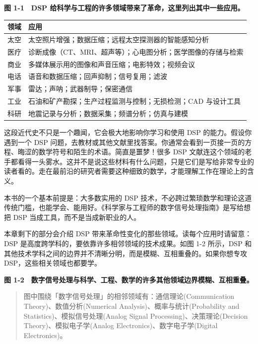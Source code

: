\textbf{图 1-1　DSP
给科学与工程的许多领域带来了革命，这里列出其中一些应用。}

{\def\LTcaptype{none} %
\begin{longtable}[]{@{}ll@{}}
\toprule\noalign{}
领域 & 应用 \\
\midrule\noalign{}
\endhead
\bottomrule\noalign{}
\endlastfoot
太空 & 太空照片增强；数据压缩；远程太空探测器的智能感知分析 \\
医疗 & 诊断成像（CT、MRI、超声等）；心电图分析；医学图像的存储与检索 \\
商业 & 多媒体展示用的图像和声音压缩；电影特效；视频会议 \\
电话 & 语音和数据压缩；回声抑制；信号复用；滤波 \\
军事 & 雷达；声呐；武器制导；保密通信 \\
工业 & 石油和矿产勘探；生产过程监测与控制；无损检测；CAD 与设计工具 \\
科研 & 地震记录与分析；数据采集；频谱分析；仿真与建模 \\
\end{longtable}
}

这段近代史不只是一个趣闻，它会极大地影响你学习和使用 DSP
的能力。假设你遇到一个 DSP
问题，去教材或其他文献里找答案。你通常会看到一页接一页的方程、晦涩的数学符号和陌生的术语。简直是噩梦！很多
DSP
文献连这个领域的老手都看得一头雾水。这并不是说这些材料有什么问题，只是它们是写给非常专业的读者看的。走在最前沿的研究者需要这种细致的数学，才能理解工作在理论上的含义。

本书的一个基本前提是：大多数实用的 DSP
技术，不必跨过繁琐数学和理论这道传统门槛，也能学会、能用好。《科学家与工程师的数字信号处理指南》是写给想把
DSP 当成工具，而不是当成新职业的人。

本章剩下的部分会介绍 DSP
带来革命性变化的那些领域。读每个应用时请留意：DSP
是高度跨学科的，要依靠许多相邻领域的技术成果。如图 1-2 所示，DSP
和其他技术学科之间的边界并不清晰分明，而是模糊、互相重叠的。如果你想专攻
DSP，这些相关领域也都要学。

\textbf{图
1-2　数字信号处理与科学、工程、数学的许多其他领域边界模糊、互相重叠。}

\begin{quote}
图中围绕「数字信号处理」的相邻领域有：通信理论(Communication
Theory)、数值分析(Numerical Analysis)、概率与统计(Probability and
Statistics)、模拟信号处理(Analog Signal Processing)、决策理论(Decision
Theory)、模拟电子学(Analog Electronics)、数字电子学(Digital
Electronics)。
\end{quote}

